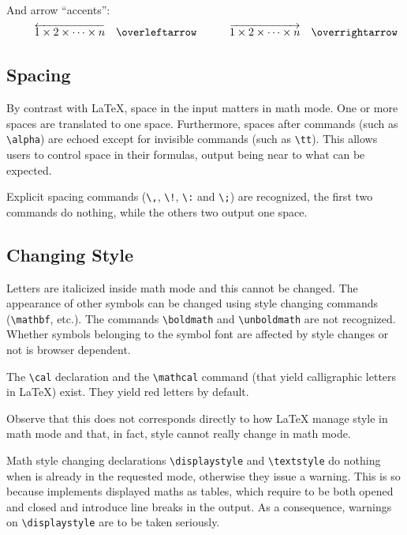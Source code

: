 And arrow ``accents'':\bgroup
\newcommand{\demo}[1]{\quad\quad#1{1 \times 2 \times \cdots \times n}\quad\texttt{\string#1}}
$$
\begin{array}{cc}
\demo{\overleftarrow} & \demo{\overrightarrow}
\end{array}
$$\egroup


\subsection{Spacing}\label{spacemathref}
By contrast with \LaTeX{}, space in the input matters in math mode.
One or more spaces are translated to one space.
Furthermore,
spaces after commands (such as \verb+\alpha+) are echoed
except for invisible commands (such as \verb+\tt+).
This allows users to control space in their formulas, output being
near to what can be expected.


Explicit spacing commands (\verb+\,+, \verb+\!+, \verb+\:+ and
\verb+\;+) are recognized, the first two commands do nothing, while
the others two output one space.

\subsection{Changing Style}

Letters are italicized inside math mode and this cannot be
changed. The appearance of
other symbols can be changed using
\LaTeXe{} style changing commands (\verb+\mathbf+, etc.).
The commands \verb+\boldmath+ and \verb+\unboldmath+ are not
recognized. Whether symbols belonging to the symbol font are affected
by style changes or not is browser dependent.

The \verb+\cal+ declaration and the \verb+\mathcal+ command (that
yield calligraphic letters in \LaTeX) exist. They yield red letters by
default.

Observe that this does not corresponds directly to how \LaTeX{} manage style
in math mode and that, in fact, style cannot really change in math mode.

Math style changing declarations \verb+\displaystyle+ and
\verb+\textstyle+ do nothing when \hevea{} is already in the requested
mode,
otherwise they issue a warning.
This is so because \hevea{} implements displayed maths as tables,
which require to be both opened and closed and introduce line breaks
in the output.
As a consequence, warnings on \verb+\displaystyle+ are to be taken seriously.


